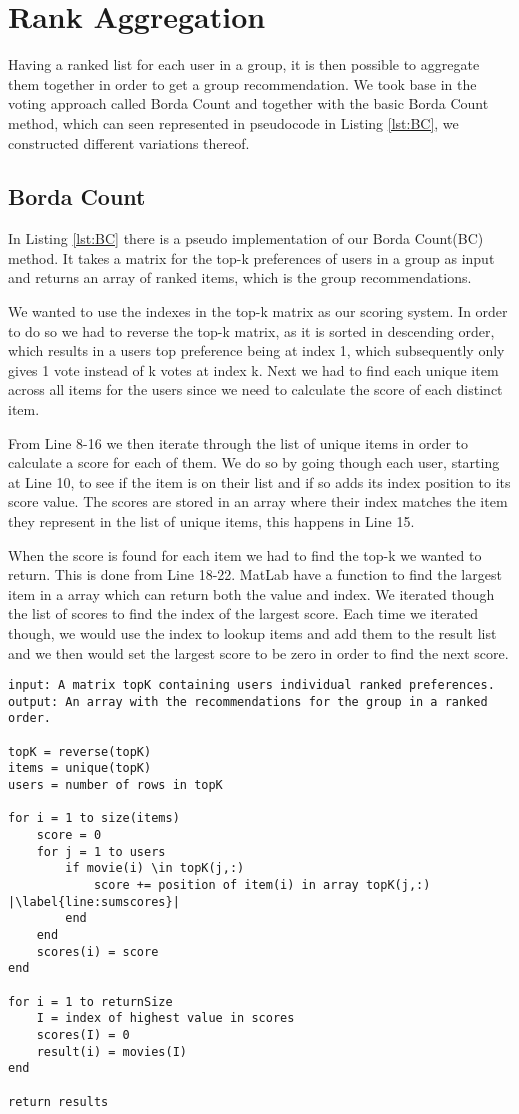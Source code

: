 \section{Rank Aggregation}\label{sec:rank_aggregation}
Having a ranked list for each user in a group, it is then possible to aggregate them together in order to get a group recommendation. We took base in the voting approach called Borda Count and together with the basic Borda Count method, which can seen represented in pseudocode in Listing \ref{lst:BC}, we constructed different variations thereof. 
\subsection{Borda Count}
In Listing \ref{lst:BC} there is a pseudo implementation of our Borda Count(BC) method. It takes a matrix for the top-k preferences of users in a group as input and returns an array of ranked items, which is the group recommendations. 

We wanted to use the indexes in the top-k matrix as our scoring system. In order to do so we had to reverse the top-k matrix, as it is sorted in descending order, which results in a users top preference being at index 1, which subsequently only gives 1 vote instead of k votes at index k. Next we had to find each unique item across all items for the users since we need to calculate the score of each distinct item.

From Line 8-16 we then iterate through the list of unique items in order to calculate a score for each of them. We do so by going though each user, starting at Line 10, to see if the item is on their list and if so adds its index position to its score value. The scores are stored in an array where their index matches the item they represent in the list of unique items, this happens in Line 15.

When the score is found for each item we had to find the top-k we wanted to return. This is done from Line 18-22. MatLab have a function to find the largest item in a array which can return both the value and index. We iterated though the list of scores to find the index of the largest score. Each time we iterated though, we would use the index to lookup items and add them to the result list and we then would set the largest score to be zero in order to find the next score. 
\begin{lstlisting}[caption={Borda count implementation},label=lst:BC,escapechar=|]
input: A matrix topK containing users individual ranked preferences.
output: An array with the recommendations for the group in a ranked order.

topK = reverse(topK)
items = unique(topK)
users = number of rows in topK

for i = 1 to size(items)
	score = 0
	for j = 1 to users
		if movie(i) \in topK(j,:)
			score += position of item(i) in array topK(j,:) |\label{line:sumscores}|
		end
	end
	scores(i) = score
end

for i = 1 to returnSize
	I = index of highest value in scores
	scores(I) = 0
	result(i) = movies(I)
end

return results

\end{lstlisting}


